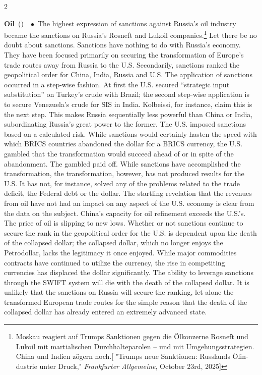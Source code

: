 \documentclass[10pt,a4paper,twoside]{article} %
\newcommand{\entry}[4]{\markboth{#1}{#1}\textbf{#1}\ {(#2)}\ \textit{#3}\ $\bullet$\ {#4}}  %
\begin{document}
\begin{multicols}{2}
\entry{Oil} {} {} {The highest expression of sanctions against Russia's oil industry became the sanctions on Russia's Rosneft and Lukoil companies.\footnote{\textgerman{Moskau reagiert auf Trumps Sanktionen gegen die Ölkonzerne Rosneft und Lukoil mit martialischen Durchhalteparolen – und mit Umgehungsstrategien. China und Indien zögern noch.[ "Trumps neue Sanktionen: Russlands Ölindustrie unter Druck," \emph{Frankfurter Allgemeine}, October 23rd, 2025]}} \newline \indent Let there be no doubt about sanctions. Sanctions have nothing to do with Russia's economy. They have been focused primarily on securing the transformation of Europe’s trade routes away from Russia to the U.S. Secondarily, sanctions ranked the geopolitical order for China, India, Russia and U.S. The application of sanctions occurred in a step-wise fashion. At first the U.S. secured “strategic input substitution” on Turkey’s crude with Brazil; the second step-wise application is to secure Venezuela’s crude for SIS in India. Kolbeissi, for instance, claim this is the next step. This makes Russia sequentially less powerful than China or India, subordinating Russia’s great power to the former. The U.S. imposed sanctions based on a calculated risk. While sanctions would certainly hasten the speed with which BRICS countries abandoned the dollar for a BRICS currency, the U.S. gambled that the transformation would succeed ahead of or in spite of the abandonment. The gambled paid off. While sanctions have accomplished the transformation, the transformation, however, has not produced results for the U.S. It has not, for instance, solved any of the problems related to the trade deficit, the Federal debt or the dollar. The startling revelation that the revenues from oil have not had an impact on any aspect of the U.S. 
economy is clear from the data on the subject. China’s capacity for oil refinement exceeds the U.S.’s. The price of oil is slipping to new lows.  Whether or not sanctions continue to secure the rank in the geopolitical order for the U.S. is dependent upon the death of the collapsed dollar; the collapsed dollar, which no longer enjoys the Petrodollar, lacks the legitimacy it once enjoyed. While major commodities contracts have continued to utilize the currency, the rise in competiting currencies 
has displaced the dollar significantly. The ability to leverage sanctions through the SWIFT system will die with the death of the collapsed dollar. It is unlikely that the sanctions on
Russia will secure the ranking, let alone the transformed European trade routes for the simple reason that the death of the collapsed dollar has already entered an extremely advanced
state.  
}


\end{multicols}
\end{document}
